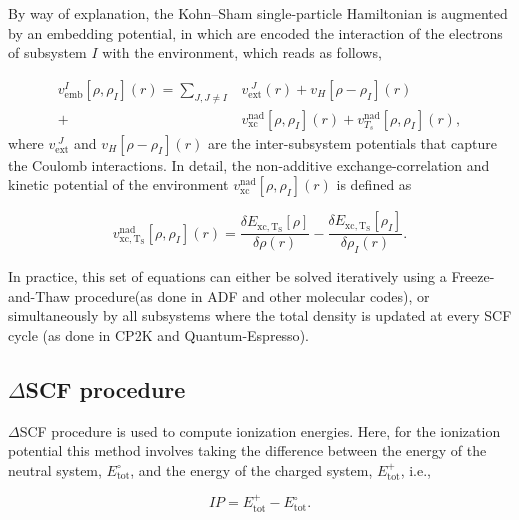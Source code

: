 \documentclass[notitlepage,12pt]{report}
\begin{document}
	By way of explanation, the Kohn–Sham single-particle Hamiltonian is augmented by an embedding potential, in which  are encoded the interaction of the electrons of subsystem $I$ with the environment, which reads as follows,

	\begin{equation}
		\begin{aligned}
			v_{\mathrm{emb}}^{I}[\rho,\rho_I](r) = \sum\limits_{J,J \neq I} &v_{\mathrm{ext}}^{\; J}(r) + v_{{H}}[\rho - \rho_I](r)  \\ + \ &v_{\mathrm{xc}}^{\mathrm{nad}}[\rho,\rho_{I}](r) + v_{T_s}^{\mathrm{nad}}[\rho,\rho_{I}](r),
		\end{aligned}
	\end{equation}
	where $v_{\mathrm{ext}}^{\; J}$ and $v_{{H}}[\rho - \rho_I](r)$ are the inter-subsystem potentials that capture the Coulomb interactions. In detail, the non-additive exchange-correlation and kinetic potential of the environment $v_{\mathrm{xc}}^{\mathrm{nad}}[\rho,\rho_{I}](r)$ is defined as
	
	\begin{equation}
		\label{emb_xct}
		v_{\mathrm{xc, T_{S}}}^{\mathrm{nad}}[\rho,\rho_{I}](r) = \frac{\delta E_{\mathrm{xc, T_{S}}}[\rho]}{\delta \rho(r)} - \frac{\delta E_{\mathrm{xc, T_{S}}}[\rho_I]}{\delta \rho_I(r)}.
	\end{equation}

	In practice, this set of equations can either be solved iteratively using  a Freeze-and-Thaw\supercite{FaT} procedure(as done in ADF\supercite{te2001chemistry} and other molecular codes), or simultaneously by all subsystems where the total density is updated at every SCF cycle (as done in CP2K \supercite{hutter2014cp2k} and Quantum-Espresso\supercite{RN48,mi2021eqe}).
	
\subsection{$\Delta$SCF procedure}

	$\Delta$SCF procedure is used to compute ionization energies\supercite{krishtal2015subsystem}. Here, for the ionization potential this method involves taking the difference between the energy of the neutral system, $E_{\mathrm{tot}}^\circ$, and the energy of the charged system, $E_{\mathrm{tot}}^+$, i.e.,

	\begin{equation}
		\label{IP}
		IP = E_{\mathrm{tot}}^+ - E_{\mathrm{tot}}^\circ.
	\end{equation}
	
\end{document}
